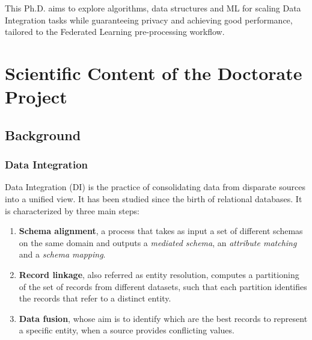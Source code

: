 \documentclass[12pt]{article}
\begin{document}
 This Ph.D. aims to explore algorithms, data structures and ML for scaling Data Integration tasks while guaranteeing privacy and achieving good performance, tailored to the Federated Learning pre-processing workflow.





\section{Scientific Content of the Doctorate Project}
\subsection{Background}
\subsubsection{Data Integration}
Data Integration (DI) is the practice of consolidating data from disparate sources into a unified view. It has been studied since the birth of relational databases. 
It is characterized by three main steps: 
\begin{enumerate}
   \item \textbf{Schema alignment}, a process that takes as input a set of different schemas on the same domain and outputs a \textit{mediated schema}, an \textit{attribute matching} and a \textit{schema mapping}.
   \item \textbf{Record linkage}, also referred as entity resolution, computes a partitioning of the set of records from different datasets, such that each partition identifies the records that refer to a distinct entity.
   \item \textbf{Data fusion}, whose aim is to identify which are the best records to represent a specific entity, when a source provides conflicting values.
\end{enumerate}
\end{document}
